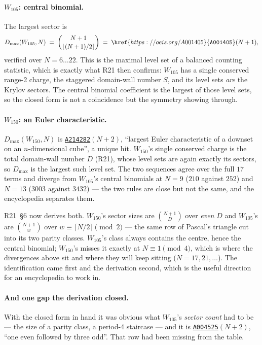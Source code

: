 \documentclass[11pt]{article}
\newcommand{\oeis}[1]{\href{https://oeis.org/#1}{\texttt{#1}}}
\theoremstyle{plain}
\begin{document}
\paragraph{$W_{105}$: central binomial.} The largest sector is
\[
D_{\max}(W_{105}, N) \;=\; \binom{N+1}{\lfloor (N+1)/2\rfloor}
\;=\; \oeis{A001405}(N+1),
\]
verified over $N=6\ldots22$. This is the maximal level set of a balanced
counting statistic, which is exactly what R21 then confirms: $W_{105}$ has a
single conserved range-2 charge, the staggered domain-wall number $S$, and its
level sets \emph{are} the Krylov sectors. The central binomial coefficient is
the largest of those level sets, so the closed form is not a coincidence but the
symmetry showing through.

\paragraph{$W_{150}$: an Euler characteristic.} $D_{\max}(W_{150},N)$ is
\oeis{A214282}$(N+2)$, ``largest Euler characteristic of a downset on an
$n$-dimensional cube'', a unique hit. $W_{150}$'s single conserved charge is the
total domain-wall number $D$ (R21), whose level sets are again exactly its
sectors, so $D_{\max}$ is the largest such level set. The two sequences agree
over the full $17$ terms and diverge from $W_{105}$'s central binomials at
$N=9$ ($210$ against $252$) and $N=13$ ($3003$ against $3432$) --- the two rules
are close but not the same, and the encyclopedia separates them.

R21~\S6 now derives both. $W_{150}$'s sector sizes are $\binom{N+1}{D}$ over
\emph{even} $D$ and $W_{105}$'s are $\binom{N+1}{w}$ over
$w \equiv \lceil N/2\rceil \pmod 2$ --- the same row of Pascal's triangle cut
into its two parity classes. $W_{105}$'s class always contains the centre, hence
the central binomial; $W_{150}$'s misses it exactly at $N \equiv 1 \pmod 4$,
which is where the divergences above sit and where they will keep sitting
($N = 17, 21, \ldots$). The identification came first and the derivation
second, which is the useful direction for an encyclopedia to work in.

\paragraph{And one gap the derivation closed.} With the closed form in hand it
was obvious what $W_{105}$'s \emph{sector count} had to be --- the size of a
parity class, a period-4 staircase --- and it is \oeis{A004525}$(N+2)$, ``one
even followed by three odd''. That row had been missing from the table.
\end{document}
